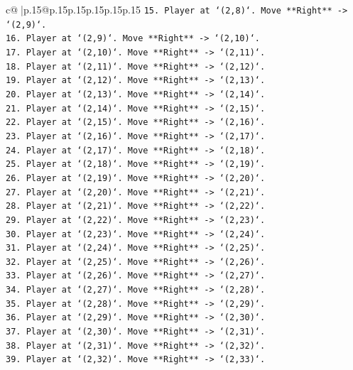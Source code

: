 \documentclass{article}
\begin{document}
{\begin{supertabular}{c@{$\;$}|p{.15\linewidth}@{}p{.15\linewidth}p{.15\linewidth}p{.15\linewidth}p{.15\linewidth}p{.15\linewidth}}
{{{\texttt{15. Player at `(2,8)`. Move **Right** {-}> `(2,9)`.} \\
\texttt{16. Player at `(2,9)`. Move **Right** {-}> `(2,10)`.} \\
\texttt{17. Player at `(2,10)`. Move **Right** {-}> `(2,11)`.} \\
\texttt{18. Player at `(2,11)`. Move **Right** {-}> `(2,12)`.} \\
\texttt{19. Player at `(2,12)`. Move **Right** {-}> `(2,13)`.} \\
\texttt{20. Player at `(2,13)`. Move **Right** {-}> `(2,14)`.} \\
\texttt{21. Player at `(2,14)`. Move **Right** {-}> `(2,15)`.} \\
\texttt{22. Player at `(2,15)`. Move **Right** {-}> `(2,16)`.} \\
\texttt{23. Player at `(2,16)`. Move **Right** {-}> `(2,17)`.} \\
\texttt{24. Player at `(2,17)`. Move **Right** {-}> `(2,18)`.} \\
\texttt{25. Player at `(2,18)`. Move **Right** {-}> `(2,19)`.} \\
\texttt{26. Player at `(2,19)`. Move **Right** {-}> `(2,20)`.} \\
\texttt{27. Player at `(2,20)`. Move **Right** {-}> `(2,21)`.} \\
\texttt{28. Player at `(2,21)`. Move **Right** {-}> `(2,22)`.} \\
\texttt{29. Player at `(2,22)`. Move **Right** {-}> `(2,23)`.} \\
\texttt{30. Player at `(2,23)`. Move **Right** {-}> `(2,24)`.} \\
\texttt{31. Player at `(2,24)`. Move **Right** {-}> `(2,25)`.} \\
\texttt{32. Player at `(2,25)`. Move **Right** {-}> `(2,26)`.} \\
\texttt{33. Player at `(2,26)`. Move **Right** {-}> `(2,27)`.} \\
\texttt{34. Player at `(2,27)`. Move **Right** {-}> `(2,28)`.} \\
\texttt{35. Player at `(2,28)`. Move **Right** {-}> `(2,29)`.} \\
\texttt{36. Player at `(2,29)`. Move **Right** {-}> `(2,30)`.} \\
\texttt{37. Player at `(2,30)`. Move **Right** {-}> `(2,31)`.} \\
\texttt{38. Player at `(2,31)`. Move **Right** {-}> `(2,32)`.} \\
\texttt{39. Player at `(2,32)`. Move **Right** {-}> `(2,33)`.} \\
}}}
\end{supertabular}}
\end{document}
